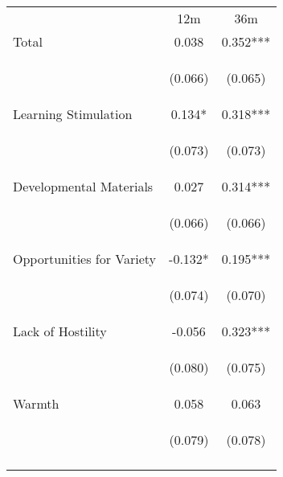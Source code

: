 \begin{tabular}{lcc}
\hline \noalign{\smallskip} & 12m & 36m\\
\noalign{\smallskip}\hline \noalign{\smallskip}Total & 0.038 & 0.352***\\
 & \begin{footnotesize}(0.066)\end{footnotesize} & \begin{footnotesize}(0.065)\end{footnotesize}\\
\noalign{\smallskip}Learning Stimulation & 0.134* & 0.318***\\
 & \begin{footnotesize}(0.073)\end{footnotesize} & \begin{footnotesize}(0.073)\end{footnotesize}\\
\noalign{\smallskip}Developmental Materials & 0.027 & 0.314***\\
 & \begin{footnotesize}(0.066)\end{footnotesize} & \begin{footnotesize}(0.066)\end{footnotesize}\\
\noalign{\smallskip}Opportunities for Variety & -0.132* & 0.195***\\
 & \begin{footnotesize}(0.074)\end{footnotesize} & \begin{footnotesize}(0.070)\end{footnotesize}\\
\noalign{\smallskip}Lack of Hostility & -0.056 & 0.323***\\
 & \begin{footnotesize}(0.080)\end{footnotesize} & \begin{footnotesize}(0.075)\end{footnotesize}\\
\noalign{\smallskip}Warmth & 0.058 & 0.063\\
 & \begin{footnotesize}(0.079)\end{footnotesize} & \begin{footnotesize}(0.078)\end{footnotesize}\\
\noalign{\smallskip}\hline\end{tabular}\\
